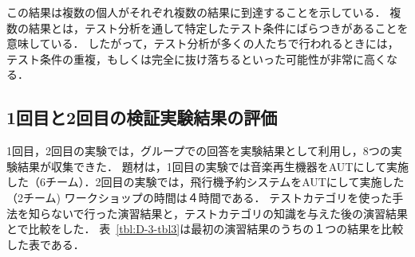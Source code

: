 この結果は複数の個人がそれぞれ複数の結果に到達することを示している．
複数の結果とは，テスト分析を通して特定したテスト条件にばらつきがあることを意味している．
したがって，テスト分析が多くの人たちで行われるときには，テスト条件の重複，もしくは完全に抜け落ちるといった可能性が非常に高くなる．

\subsection{1回目と2回目の検証実験結果の評価}
1回目，2回目の実験では，グループでの回答を実験結果として利用し，8つの実験結果が収集できた．
題材は，1回目の実験では音楽再生機器をAUTにして実施した（6チーム）．2回目の実験では，飛行機予約システムをAUTにして実施した（2チーム)
ワークショップの時間は４時間である．
テストカテゴリを使った手法を知らないで行った演習結果と，テストカテゴリの知識を与えた後の演習結果とで比較をした．
表~\ref{tbl:D-3-tbl3}は最初の演習結果のうちの１つの結果を比較した表である．
